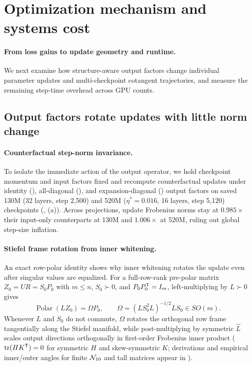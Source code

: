 \FloatBarrier
\section{Optimization mechanism and systems cost}
\label{sec:mechanism_cost}

\paragraph{From loss gains to update geometry and runtime.}
We next examine how structure-aware output factors change individual parameter updates and multi-checkpoint cotangent trajectories, and measure the remaining step-time overhead across GPU counts.

\subsection{Output factors rotate updates with little norm change}
\label{sec:mechanism}

\paragraph{Counterfactual step-norm invariance.}
To isolate the immediate action of the output operator, we hold checkpoint momentum and input factors fixed and recompute counterfactual updates under identity (), all-diagonal (), and expansion-diagonal () output factors on saved 130M (32 layers, step 2,500) and 520M ($\eta^*=0.016$, 16 layers, step 5,120) checkpoints (, (a)). Across projections,  update Frobenius norms stay at $0.985\times$ their input-only counterparts at 130M and $1.006\times$ at 520M, ruling out global step-size inflation.

\paragraph{Stiefel frame rotation from inner whitening.}
An exact row-polar identity shows why inner whitening rotates the update even after singular values are equalized. For a full-row-rank pre-polar matrix $Z_0=UR=S_0P_0$ with $m\le n$, $S_0\succ0$, and $P_0P_0^{{\mathsf{T}}}=I_m$, left-multiplying by $L\succ0$ gives
\begin{equation}
 \operatorname{Polar}(LZ_0)=\Omega P_0,\qquad
 \Omega=(LS_0^2L)^{-1/2}LS_0\in SO(m).
 \label{eq:som_rotation}
\end{equation}
Whenever $L$ and $S_0$ do not commute, $\Omega$ rotates the orthogonal row frame tangentially along the Stiefel manifold, while post-multiplying by symmetric $\hat L$ scales output directions orthogonally in first-order Frobenius inner product ($\operatorname{tr}(HK^{{\mathsf{T}}})=0$ for symmetric $H$ and skew-symmetric $K$; derivations and empirical inner/outer angles for finite $\mathcal{N}_{10}$ and tall matrices appear in ).

